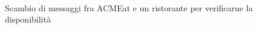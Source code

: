 \documentclass[11pt]{article} %
\begin{document}
\begin{figure}[!ht]
\begin{center}
\vspace*{0.5cm}\\
\caption{Scambio di messaggi fra ACMEat e un ristorante per verificarne la disponibilità}
\end{center}
\end{figure}
\end{document}

